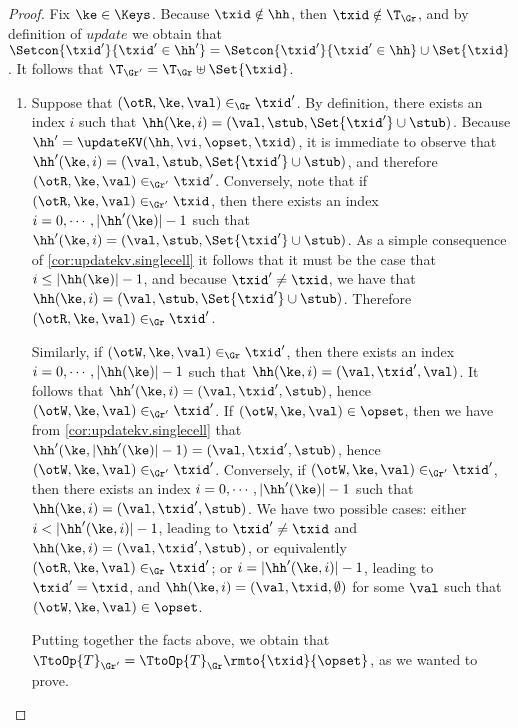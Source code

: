 \begin{proof}
Fix $\ke \in \Keys$. Because $\txid \notin \hh$, then $\txid \notin \T_{\Gr}$, 
and by definition of $update$ we obtain that $\Setcon{\txid' }{ \txid' \in \hh'} = 
\Setcon{\txid' }{ \txid' \in \hh} \cup \Set{\txid}$. It follows that $\T_{\Gr'} = \T_{\Gr} \uplus \Set{\txid }$.

\begin{enumerate}
\item Suppose that $(\otR, \ke, \val) \in_{\Gr} \txid'$. By definition, 
there exists an index $i$ such 
that $\hh(\ke, i) = (\val, \stub, \Set{\txid'} \cup \stub)$. Because $\hh' = \updateKV(\hh, \vi, \opset, \txid)$, 
it is immediate to observe that $\hh'(\ke, i) = (\val, \stub, \Set{\txid'} \cup \stub)$, and therefore 
$(\otR,\ke, \val) \in_{\Gr'} \txid'$. Conversely, note that if $(\otR, \ke, \val) \in_{\Gr'} \txid$, 
then there exists an index $i = 0,\cdots, \lvert \hh'(\ke) \rvert - 1$ such that 
$\hh'(\ke, i) = (\val, \stub, \Set{\txid'} \cup \stub)$. As a simple consequence of \cref{cor:updatekv.singlecell} 
it follows that it must be the case that $i \leq \lvert \hh(\ke) \rvert - 1$, and because 
$\txid' \neq \txid$, we have that $\hh(\ke, i) = (\val, \stub, \Set{\txid'} \cup \stub)$. Therefore 
$(\otR, \ke, \val) \in_{\Gr} \txid'$. 

Similarly, if $(\otW, \ke, \val) \in_{\Gr} \txid'$, 
then there exists an index $i=0,\cdots, \lvert \hh(\ke) \rvert - 1$ such that 
$\hh(\ke, i) = (\val, \txid', \val)$. It follows that $\hh'(\ke, i) = (\val, \txid', \stub)$, hence 
$(\otW, \ke, \val) \in_{\Gr'} \txid'$. If $(\otW, \ke, \val) \in \opset$, then we 
have from \cref{cor:updatekv.singlecell} that $\hh'(\ke, \lvert \hh'(\ke) \rvert - 1) = (\val, \txid', \stub)$, 
hence $(\otW, \ke, \val) \in_{\Gr'} \txid'$. 
Conversely, if $(\otW, \ke, \val) \in_{\Gr'} \txid'$, then there exists an index 
$i = 0, \cdots, \lvert \hh'(\ke) \rvert - 1$ such that $\hh(\ke, i) = (\val, \txid', \stub)$. 
We have two possible cases: either $i < \lvert \hh'(\ke, i) \rvert - 1$, leading to  
$\txid' \neq \txid$ and $\hh(\ke, i) = (\val, \txid', \stub)$, or equivalently 
$(\otR,\ke, \val) \in_{\Gr} \txid'$; or $i = \lvert \hh'(\ke, i) \rvert - 1$, 
leading to $\txid' = \txid$, and $\hh(\ke, i) = (\val, \txid, \emptyset)$ 
for some $\val$ such that $(\otW, \ke, \val) \in \opset$. 

Putting together the facts above, we obtain that $\TtoOp{T}_{\Gr'} = 
\TtoOp{T}_{\Gr}\rmto{\txid}{\opset}$, as we wanted to prove.


\end{enumerate}
\end{proof}
